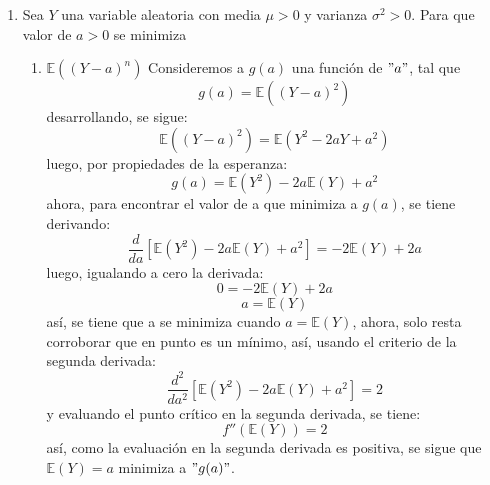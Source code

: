 \documentclass[12pt,a4paper]{report}
\begin{document}
\begin{enumerate}
		\item{
			Sea $Y$ una variable aleatoria con media $\mu > 0$ y varianza
			$\sigma^2 > 0$. Para que valor de $a > 0$ se minimiza
			\begin{enumerate}
				\item {
					$\mathbb{E}((Y-a)^n)$
				}
				\newline
				Consideremos a $g(a)$ una función de $"a"$, tal que
					$$ g(a) = \mathbb{E}((Y - a)^2) $$
				desarrollando, se sigue:
					$$ \mathbb{E}((Y - a)^2) = \mathbb{E}(Y^2 - 2aY + a^2) $$
				luego, por propiedades de la esperanza:
					$$ g(a) = \mathbb{E}(Y^2) - 2a\mathbb{E}(Y) + a^2 $$
				ahora, para encontrar el valor de a que minimiza a $ g(a) $, se
				tiene derivando:
					$$ \frac{d}{da} [\mathbb{E}(Y^2) - 2a\mathbb{E}(Y) + a^2]
					 = -2\mathbb{E}(Y) + 2a $$
				luego, igualando a cero la derivada:
					$$ 0  =-2\mathbb{E}(Y) + 2a $$
					$$ a = \mathbb{E}(Y) $$
				así, se tiene que a se minimiza cuando $ a = \mathbb{E}(Y) $,
				ahora, solo resta corroborar que en punto es un mínimo, así,
				usando el criterio de la segunda derivada:
					$$ \frac{d^2}{da^2}[\mathbb{E}(Y^2) - 2a\mathbb{E}(Y) + a^2]
				     = 2$$
				y evaluando el punto crítico en la segunda derivada, se tiene:
					$$ f''(\mathbb{E}(Y)) = 2 $$
				así, como la evaluación en la segunda derivada es positiva, se sigue que $ \mathbb{E}(Y) = a $ minimiza a $"g(a)"$.


\end{enumerate}}
\end{enumerate}
\end{document}
